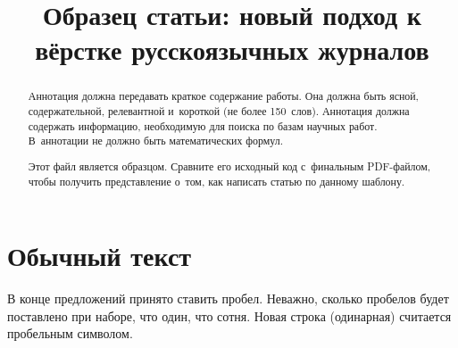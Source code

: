 \documentclass[final,pdftex]{epsilonj}
\numberwithin{equation}{section}
\begin{document}
\begin{frontmatter}
\title{Образец статьи: новый подход к вёрстке русскоязычных журналов\protect{}}

\begin{aug}
\author{ }%
\author{ }%
\author{ 
}


\address{Адрес первого и второго автора,
как правило, в пару строк\\
}

\address{Адрес третьего автора,
как правило, в пару строк,
обычно в одну-две\\
}
\end{aug}

\begin{abstract}
Аннотация должна передавать краткое содержание работы.
Она должна быть ясной, содержательной, релевантной и~короткой
(не более 150~слов). Аннотация должна содержать информацию,
необходимую для поиска по базам научных работ. 
В~аннотации не должно быть математических формул.

Этот файл является образцом. Сравните его исходный код
с~финальным PDF-файлом, чтобы получить представление о~том,
как написать статью по данному шаблону.
\end{abstract}

\begin{keyword}
\kwd{\LaTeX}
\end{keyword}

\end{frontmatter}


\section{Обычный текст}

В конце   предложений принято ставить пробел. Неважно, сколько
пробелов будет поставлено при наборе, что один, что сотня.
Новая строка (одинарная) считается пробельным символом.
\end{document}
